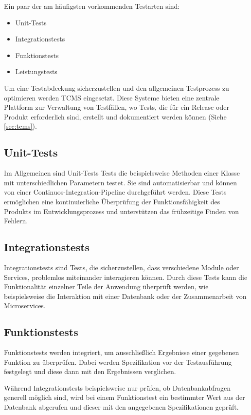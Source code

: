 \documentclass[a4paper, fontsize=11pt, parskip=half, twoside]{scrreprt}
\begin{document}
	Ein paar der am häufigsten vorkommenden Testarten sind:
	
	\begin{itemize}
		\item Unit-Tests
		\item Integrationstests
		\item Funktionstests
		\item Leistungstests
	\end{itemize}

	Um eine Testabdeckung sicherzustellen und den allgemeinen Testprozess zu optimieren werden \ac{TCMS} eingesetzt. 
	Diese Systeme bieten eine zentrale Plattform zur Verwaltung von Testfällen, wo Tests, die für ein Release oder Produkt erforderlich sind, erstellt und dokumentiert werden können (Siehe \autoref{sec:tcms}). 
	
	\textcite{ammann_introduction_2016}
	
	\subsection{Unit-Tests}
	Im Allgemeinen sind Unit-Tests Tests die beispielsweise Methoden einer Klasse mit unterschiedlichen Parametern testet. 
	Sie sind automatisierbar und können von einer Continuos-Integration-Pipeline durchgeführt werden. 
	Diese Tests ermöglichen eine kontinuierliche Überprüfung der Funktionsfähigkeit des Produkts im Entwicklungsprozess und unterstützen das frühzeitige Finden von Fehlern.
	
	\subsection{Integrationstests}
	Integrationstests sind Tests, die sicherzustellen, dass verschiedene Module oder Services, problemlos miteinander interagieren können. 
	Durch diese Tests kann die Funktionalität einzelner Teile der Anwendung überprüft werden, wie beispielsweise die Interaktion mit einer Datenbank oder der Zusammenarbeit von Microservices.
	
	\subsection{Funktionstests}
	Funktionstests werden integriert, um ausschließlich Ergebnisse einer gegebenen Funktion zu überprüfen. Dabei werden Spezifikation vor der Testausführung festgelegt und diese dann mit den Ergebnissen verglichen.
	
	Während Integrationstests beispielsweise nur prüfen, ob Datenbankabfragen generell möglich sind, wird bei einem Funktionstest ein bestimmter Wert aus der Datenbank abgerufen und dieser mit den angegebenen Spezifikationen geprüft.
	
\end{document}
